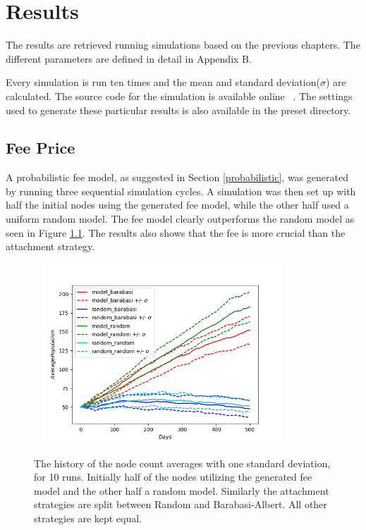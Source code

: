 \chapter{Results}

The results are retrieved running simulations based on the previous chapters. The different parameters are defined in detail in Appendix B.

Every simulation is run ten times and the mean and standard deviation($\sigma$) are calculated. The source code for the simulation is available online~\cite{repository:me:thesis} . The settings used to generate these particular results is also available in the preset directory. 


\section{Fee Price}

A probabilistic fee model, as suggested in Section \ref{probabilistic}, was generated by running three sequential simulation cycles. A simulation was then set up with half the initial nodes using the generated fee model, while the other half used a uniform random model. The fee model clearly outperforms the random model as seen in Figure \ref{fig:history_price}. The results also shows that the fee is more crucial than the attachment strategy. 

\begin{figure}[!htb]

	\hspace*{-0.5cm}\ 
	\centering
	\includegraphics[width=9cm]{images/histories_deviation_price.png}
	\caption{ The history of the node count averages with one standard deviation, for 10 runs. Initially half of the nodes utilizing the generated fee model and the other half a random model. Similarly the attachment strategies are split between Random and Barabasi-Albert. All other strategies are kept equal.
	}
	\label{fig:history_price}
	\hspace*{2mm} 
\end{figure}

